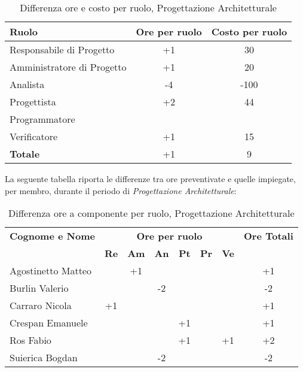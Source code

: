 \begin{table}[h]
	\centering
	\begin{tabular}{|l|c|c|}
		\toprule
		\textbf{Ruolo} & \textbf{Ore per ruolo} & \textbf{Costo per ruolo} \\
		
		\midrule
		Responsabile di Progetto & +1 & 30 \\
		Amministratore di Progetto & +1 & 20 \\ 
		Analista & -4 & -100 \\
		Progettista & +2 & 44 \\
		Programmatore & & \\
		Verificatore & +1 & 15 \\
		\midrule
		\textbf{Totale} & +1 & 9 \\
		
		\bottomrule
	\end{tabular}
	\caption{Differenza ore e costo per ruolo, Progettazione Architetturale}
	\label{tab5}
\end{table} 

\noindent La seguente tabella riporta le differenze tra ore preventivate e quelle impiegate, per membro, durante il periodo di \textit{Progettazione Architetturale}: 
\begin{table}[h]
	\centering
	\begin{tabular}{|l|c|c|c|c|c|c|c|}
		\toprule
		\textbf{Cognome e Nome} & \multicolumn{6}{c}{\textbf{Ore per ruolo}} & \textbf{Ore Totali} \\
		& \textbf{Re} & \textbf{Am} & \textbf{An} & \textbf{Pt} & \textbf{Pr} & \textbf{Ve} & \\
		
		\midrule
		Agostinetto Matteo & & +1 & & & & & +1 \\
		Burlin Valerio & & & -2 & & & & -2 \\ 
		Carraro Nicola & +1 & & & & & & +1 \\
		Crespan Emanuele & & & & +1 & & & +1 \\
		Ros Fabio & & & & +1 & & +1 & +2 \\
		Suierica Bogdan & & & -2 & & & & -2 \\
		
		\bottomrule
	\end{tabular}
	\caption{Differenza ore a componente per ruolo, Progettazione Architetturale}
\end{table}

